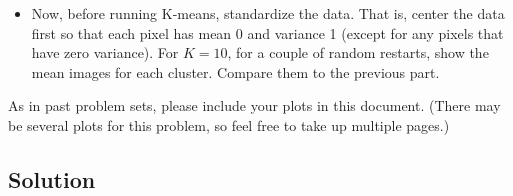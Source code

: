 \documentclass[submit]{harvardml}
\begin{document}
\begin{problem}
\begin{itemize}
\item Now, before running K-means, standardize the data.  That is,
  center the data first so that each pixel has mean 0 and variance 1
  (except for any pixels that have zero variance).  For $K=10$, for a
  couple of random restarts, show the mean images for each cluster.
  Compare them to the previous part.

\end{itemize}

As in past problem sets, please include your plots in this
document. (There may be several plots for this problem, so feel free
to take up multiple pages.)

\end{problem}

\subsection*{Solution}
\end{document}
